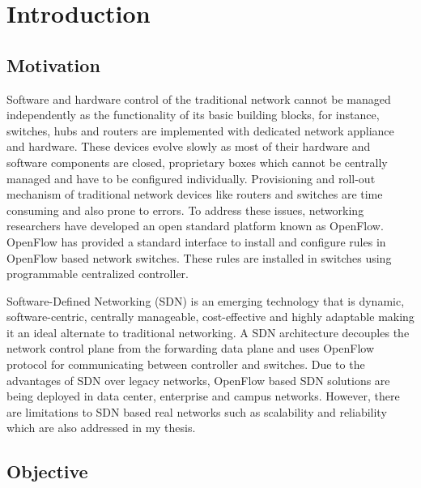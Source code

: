 \chapter{Introduction}
\label{ch:Introduction}
\section{Motivation}
Software and hardware control of the traditional network cannot be managed independently as the functionality of its basic building blocks, for instance, switches, hubs and routers are implemented with dedicated network appliance and hardware. These devices evolve slowly as most of their hardware and software components are closed, proprietary boxes which cannot be centrally managed and have to be configured individually. Provisioning and roll-out mechanism of traditional network devices like routers and switches are time consuming and also prone to errors\cite {OpenFlow}.
To address these issues, networking researchers have developed an open standard platform known as OpenFlow\cite{OpenFlow}.  OpenFlow has provided a standard interface to install and configure rules in OpenFlow based network switches. These rules are installed in switches using programmable centralized controller.

Software-Defined Networking (SDN) is an emerging technology that is dynamic, software-centric, centrally manageable, cost-effective and highly adaptable making it an ideal alternate to traditional networking\cite{OpenFlow}. A SDN architecture decouples the network control plane from the forwarding data plane and uses OpenFlow protocol for communicating between controller and switches. Due to the advantages of SDN over legacy networks, OpenFlow based SDN solutions are being deployed in data center, enterprise and campus networks. However, there are limitations to SDN based real networks such as scalability and reliability which are also addressed in my thesis.

\section{Objective}
\label{ch:Introduction:sec:Objective}

